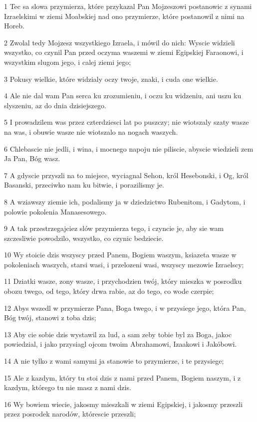 \par 1 Tec sa slowa przymierza, które przykazal Pan Mojzeszowi postanowic z synami Izraelskimi w ziemi Moabskiej nad ono przymierze, które postanowil z nimi na Horeb.
\par 2 Zwolal tedy Mojzesz wszystkiego Izraela, i mówil do nich: Wyscie widzieli wszystko, co czynil Pan przed oczyma waszemi w ziemi Egipskiej Faraonowi, i wszystkim slugom jego, i calej ziemi jego;
\par 3 Pokusy wielkie, które widzialy oczy twoje, znaki, i cuda one wielkie.
\par 4 Ale nie dal wam Pan serca ku zrozumieniu, i oczu ku widzeniu, ani uszu ku slyszeniu, az do dnia dzisiejszego.
\par 5 I prowadzilem was przez czterdziesci lat po puszczy; nie wiotszaly szaty wasze na was, i obuwie wasze nie wiotszalo na nogach waszych.
\par 6 Chlebascie nie jedli, i wina, i mocnego napoju nie piliscie, abyscie wiedzieli zem Ja Pan, Bóg wasz.
\par 7 A gdyscie przyszli na to miejsce, wyciagnal Sehon, król Hesebonski, i Og, król Basanski, przeciwko nam ku bitwie, i porazilismy je.
\par 8 A wziawszy ziemie ich, podalismy ja w dziedzictwo Rubenitom, i Gadytom, i polowie pokolenia Manasesowego.
\par 9 A tak przestrzegajciez slów przymierza tego, i czyncie je, aby sie wam szczesliwie powodzilo, wszystko, co czynic bedziecie.
\par 10 Wy stoicie dzis wszyscy przed Panem, Bogiem waszym, ksiazeta wasze w pokoleniach waszych, starsi wasi, i przelozeni wasi, wszyscy mezowie Izraelscy;
\par 11 Dziatki wasze, zony wasze, i przychodzien twój, który mieszka w posrodku obozu twego, od tego, który drwa rabie, az do tego, co wode czerpie;
\par 12 Abys wszedl w przymierze Pana, Boga twego, i w przysiege jego, która Pan, Bóg twój, stanowi z toba dzis;
\par 13 Aby cie sobie dzis wystawil za lud, a sam zeby tobie byl za Boga, jakoc powiedzial, i jako przysiagl ojcom twoim Abrahamowi, Izaakowi i Jakóbowi.
\par 14 A nie tylko z wami samymi ja stanowie to przymierze, i te przysiege;
\par 15 Ale z kazdym, który tu stoi dzis z nami przed Panem, Bogiem naszym, i z kazdym, którego tu nie masz z nami dzis.
\par 16 Wy bowiem wiecie, jakosmy mieszkali w ziemi Egipskiej, i jakosmy przeszli przez posrodek narodów, którescie przeszli;
